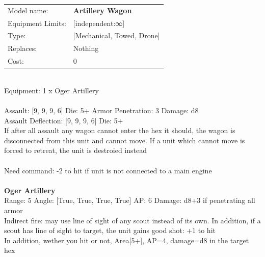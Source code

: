 \noindent
\begin{tabular}{ll}
Model name: &{\bf Artillery Wagon } \\
Equipment Limits: &[independent:∞] \\
Type: &[Mechanical, Towed, Drone] \\
Replaces: &Nothing \\
Cost: & 0\\
\end{tabular}
\ \\
Equipment: 1 x Oger Artillery \\
\ \\
Assault: [9, 9, 9, 6] Die: 5+ Armor Penetration: 3 Damage: d8 \\
Assault Deflection: [9, 9, 9, 6] Die: 5+\\
\indent If after all assault any wagon cannot enter the hex it should, the wagon is disconnected from this unit and cannot move. If a unit which cannot move is forced to retreat, the unit is destroied instead\\ 
 
\ \\
Need command: -2 to hit if unit is not connected to a main engine\\ 

\ \\
{\bf Oger Artillery } \\



Range: 5  Angle: [True, True, True, True] AP: 6 Damage: d8+3 if penetrating all armor \\
Indirect fire: may use line of sight of any scout instead of its own. In addition, if a scout has line of sight to target, the unit gains good shot: +1 to hit\\ 
In addition, wether you hit or not, Area[5+], AP=4, damage=d8 in the target hex\\ 




 
\ \\














